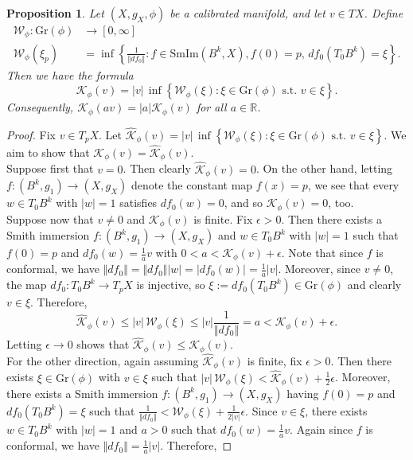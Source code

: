 \documentclass[11pt]{article}
\newcommand{\R}{\mathbb{R}}
\newtheorem{prop}[thm]{Proposition}
\theoremstyle{definition}
\numberwithin{equation}{section}
\begin{document}
\begin{prop} \label{lem:K-Basics}  Let $(X,g_X, \phi)$ be a calibrated manifold, and let $v \in TX$.  Define
\begin{align*}
\mathcal{W}_\phi \colon \mathrm{Gr}(\phi) & \to [0,  \infty] \\
\mathcal{W}_\phi(\xi_p) & = \inf\!\left\{ \frac{1}{\Vert df_0 \Vert} \colon f \in \mathrm{SmIm}(B^k, X), f(0) = p,\, df_0(T_0B^k) = \xi\right\}\!.
\end{align*}
Then we have the formula
$$\mathcal{K}_\phi(v) =  \left| v \right|\, \inf\!\left\{ \mathcal{W}_\phi(\xi) \colon \xi \in \mathrm{Gr}(\phi) \text{ s.t. } v \in \xi \right\}\!.$$
Consequently, $\mathcal{K}_\phi(av) = \left|a\right| \mathcal{K}_\phi(v)$ for all $a \in \R$.
\end{prop}
\begin{proof} Fix $v \in T_pX$.  Let $\widehat{\mathcal{K}}_\phi(v) = \left| v \right|\, \inf\!\left\{ \mathcal{W}_\phi(\xi) \colon \xi \in \mathrm{Gr}(\phi) \text{ s.t. } v \in \xi \right\}$.  We aim to show that $\mathcal{K}_\phi(v) = \widehat{\mathcal{K}}_\phi(v)$.  \\
\indent Suppose first that $v = 0$.  Then clearly $\widehat{\mathcal{K}}_\phi(v) = 0$.  On the other hand, letting $f \colon (B^k, g_1) \to (X, g_X)$ denote the constant map $f(x) = p$, we see that every $w \in T_0B^k$ with $|w| = 1$ satisfies $df_0(w) = 0$, and so $\mathcal{K}_\phi(v) = 0$, too. \\
\indent Suppose now that $v \neq 0$ and $\mathcal{K}_\phi(v)$ is finite.  Fix $\epsilon > 0$.  Then there exists a Smith immersion $f \colon (B^k, g_1) \to (X,g_X)$ and $w \in T_0B^k$ with $|w| = 1$ such that $f(0) = p$ and $df_0(w) = \frac{1}{a}v$ with $0 < a < \mathcal{K}_\phi(v) + \epsilon$.  Note that since $f$ is conformal, we have $\Vert df_0 \Vert = \Vert df_0 \Vert |w| = |df_0(w)| = \frac{1}{a}|v|$.  Moreover, since $v \neq 0$, the map $df_0\colon T_0B^k \to T_pX$ is injective, so $\xi := df_0(T_0B^k) \in \mathrm{Gr}(\phi)$ and clearly $v \in \xi$.  Therefore,
$$\widehat{\mathcal{K}}_\phi(v) \leq |v|\, \mathcal{W}_\phi(\xi) \leq |v| \frac{1}{\Vert df_0 \Vert} = a < \mathcal{K}_\phi(v) + \epsilon.$$
Letting $\epsilon \to 0$ shows that $\widehat{\mathcal{K}}_\phi(v) \leq \mathcal{K}_\phi(v)$. \\
\indent For the other direction, again assuming $ \widehat{\mathcal{K}}_\phi(v)$ is finite, fix $\epsilon > 0$.  Then there exists $\xi \in \mathrm{Gr}(\phi)$ with $v \in \xi$ such that $|v|\, \mathcal{W}_\phi(\xi) < \widehat{\mathcal{K}}_\phi(v) + \frac{1}{2}\epsilon$.  Moreover, there exists a Smith immersion $f \colon (B^k, g_1) \to (X, g_X)$ having $f(0) = p$ and $df_0(T_0B^k) = \xi$ such that $\frac{1}{\Vert df_0 \Vert} < \mathcal{W}_\phi(\xi) + \frac{1}{2|v|}\epsilon$.  Since $v \in \xi$, there exists $w \in T_0B^k$ with $|w| = 1$ and $a > 0$ such that $df_0(w) = \frac{1}{a}v$.  Again since $f$ is conformal, we have $\Vert df_0 \Vert = \frac{1}{a}|v|$.  Therefore,

\end{proof}
\end{document}
